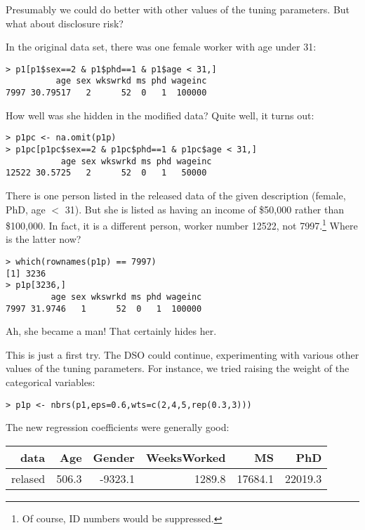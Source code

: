 \documentclass[11pt]{article}
\begin{document}
Presumably we could do better with other values of the tuning
parameters.  But what about disclosure risk?

In the original data set, there was one female worker with age under 31:

\begin{lstlisting}
> p1[p1$sex==2 & p1$phd==1 & p1$age < 31,]
          age sex wkswrkd ms phd wageinc
7997 30.79517   2      52  0   1  100000
\end{lstlisting}

How well was she hidden in the modified data?  Quite well, it turns out:

\begin{lstlisting}
> p1pc <- na.omit(p1p)
> p1pc[p1pc$sex==2 & p1pc$phd==1 & p1pc$age < 31,]
           age sex wkswrkd ms phd wageinc
12522 30.5725   2      52  0   1   50000 
\end{lstlisting}

There is one person listed in the released data of the given description
(female, PhD, age $<$ 31).  But she is listed as having an income of
\$50,000 rather than \$100,000.  In fact, it is a different person, worker
number 12522, not 7997.\footnote{Of course, ID numbers would be suppressed.}
Where is the latter now?

\begin{lstlisting}
> which(rownames(p1p) == 7997)
[1] 3236
> p1p[3236,]
         age sex wkswrkd ms phd wageinc
7997 31.9746   1      52  0   1  100000
\end{lstlisting}

Ah, she became a man!  That certainly hides her.  

This is just a first try.  The DSO could continue, experimenting with
various other values of the tuning parameters.  For instance,
we tried raising the weight of the categorical variables:


\begin{lstlisting}
> p1p <- nbrs(p1,eps=0.6,wts=c(2,4,5,rep(0.3,3)))
\end{lstlisting}

The new regression coefficients were generally good:

\begin{tabular}{|r|r|r|r|r|r|}
\hline
data & Age & Gender & WeeksWorked & MS & PhD \\ \hline 
relased & 506.3  & -9323.1  & 1289.8 & 17684.1 & 22019.3 \\ \hline 
\end{tabular}
\end{document}

